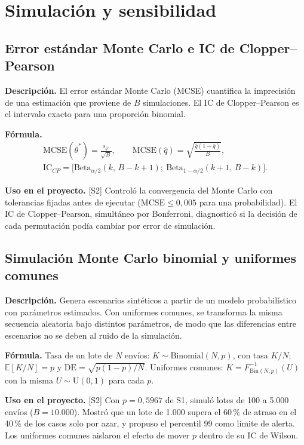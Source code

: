 \documentclass[11pt,a4paper]{article}
\newcommand{\desc}{\textbf{Descripción.} }
\newcommand{\formula}{\textbf{Fórmula.} }
\newcommand{\uso}{\textbf{Uso en el proyecto.} }
\newcommand{\fase}[1]{{\footnotesize\color{gris}[#1]}}
\begin{document}
\section{Simulación y sensibilidad}\label{sec:simulacion}

\subsection{Error estándar Monte Carlo e IC de Clopper--Pearson}
\desc El error estándar Monte Carlo (MCSE) cuantifica la imprecisión de una estimación que proviene de $B$ simulaciones. El IC de Clopper--Pearson es el intervalo exacto para una proporción binomial.

\formula
\begin{gather*}
\mathrm{MCSE}(\bar\theta^*)=\frac{s_{\theta^*}}{\sqrt B},\qquad \mathrm{MCSE}(\hat q)=\sqrt{\frac{\hat q(1-\hat q)}{B}},\\
\text{IC}_{CP}=\Big[\mathrm{Beta}_{\alpha/2}(k,\,B-k+1);\ \mathrm{Beta}_{1-\alpha/2}(k+1,\,B-k)\Big].
\end{gather*}

\uso \fase{S2} Controló la convergencia del Monte Carlo con tolerancias fijadas antes de ejecutar ($\mathrm{MCSE}\le0{,}005$ para una probabilidad). El IC de Clopper--Pearson, simultáneo por Bonferroni, diagnosticó si la decisión de cada permutación podía cambiar por error de simulación.

\subsection{Simulación Monte Carlo binomial y uniformes comunes}
\desc Genera escenarios sintéticos a partir de un modelo probabilístico con parámetros estimados. Con uniformes comunes, se transforma la misma secuencia aleatoria bajo distintos parámetros, de modo que las diferencias entre escenarios no se deben al ruido de la simulación.

\formula Tasa de un lote de $N$ envíos: $K\sim\mathrm{Binomial}(N,p)$, con tasa $K/N$; $\mathbb E[K/N]=p$ y $\mathrm{DE}=\sqrt{p(1-p)/N}$. Uniformes comunes: $K=F^{-1}_{\mathrm{Bin}(N,p)}(U)$ con la misma $U\sim\mathrm U(0,1)$ para cada $p$.

\uso \fase{S2} Con $p=0{,}5967$ de S1, simuló lotes de 100 a 5.000 envíos ($B=10.000$). Mostró que un lote de 1.000 supera el 60\,\% de atraso en el 40\,\% de los casos solo por azar, y propuso el percentil 99 como límite de alerta. Los uniformes comunes aislaron el efecto de mover $p$ dentro de su IC de Wilson.
\end{document}
